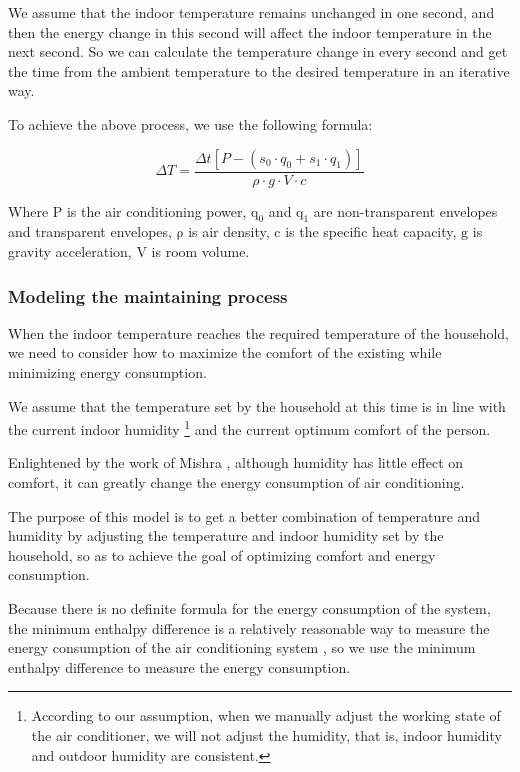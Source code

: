 \documentclass{mcmthesis}
\begin{document}
				We assume that the indoor temperature remains unchanged in one second, and then the energy change in this second will affect the indoor temperature in the next second. So we can calculate the temperature change in every second and get the time from the ambient temperature to the desired temperature in an iterative way.
				
				To achieve the above process, we use the following formula:
				
				\begin{equation}
					\Delta T = \frac{\Delta t [P - ( s_0 \cdot q_0+s_1 \cdot q_1)]}{\rho \cdot g \cdot V \cdot c}
				\end{equation}
				
				Where $\mathrm{P}$ is the air conditioning power, $\mathrm{q_0}$ and $\mathrm{q_1}$  are non-transparent envelopes and transparent envelopes, $\mathrm{\rho}$ is air density, $\mathrm{c}$ is the specific heat capacity, $\mathrm{g}$ is gravity acceleration, $\mathrm{V}$ is room volume.
				
	
				
			
				
			\subsubsection{Modeling the maintaining process}
			
				When the indoor temperature reaches the required temperature of the household, we need to consider how to maximize the comfort of the existing while minimizing energy consumption.
				
				We assume that the temperature set by the household at this time is in line with the current indoor humidity \footnote{According to our assumption, when we manually adjust the working state of the air conditioner, we will not adjust the humidity, that is, indoor humidity and outdoor humidity are consistent.} and the current optimum comfort of the person.
				
				Enlightened by the work of Mishra \cite{mishra2013field}, although humidity has little effect on comfort, it can greatly change the energy consumption of air conditioning.
				
				The purpose of this model is to get a better combination of temperature and humidity by adjusting the temperature and indoor humidity set by the household, so as to achieve the goal of optimizing comfort and energy consumption.
				
				Because there is no definite formula for the energy consumption of the system, the minimum enthalpy difference is a relatively reasonable way to measure the energy consumption of the air conditioning system \cite{__2010}, so we use the minimum enthalpy difference to measure the energy consumption.
				
\end{document}
